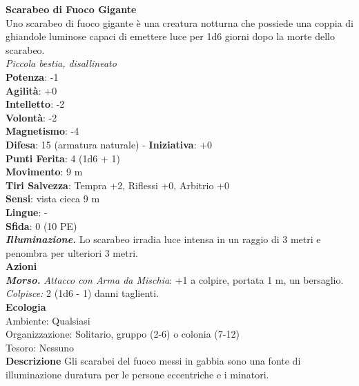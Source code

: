 \begin{multicols}{2}
\medskip\textbf{Scarabeo di Fuoco Gigante}\\
Uno scarabeo di fuoco gigante è una creatura notturna che possiede una coppia di ghiandole luminose capaci di emettere luce per 1d6 giorni dopo la morte dello scarabeo.\\
\emph{Piccola bestia, disallineato}\\
\textbf{Potenza}: -1\\
\textbf{Agilità}: +0\\
\textbf{Intelletto}: -2\\
\textbf{Volontà}: -2\\
\textbf{Magnetismo}: -4\\
\textbf{Difesa}: 15 (armatura naturale) - \textbf{Iniziativa}: +0\\
\textbf{Punti Ferita}: 4 (1d6 + 1)\\
\textbf{Movimento}: 9 m\\
\textbf{Tiri Salvezza}: Tempra +2, Riflessi +0, Arbitrio +0\\
\textbf{Sensi}: vista cieca 9 m\\
\textbf{Lingue}: -\\
\textbf{Sfida}: 0 (10 PE)\smallskip\\
\emph{\textbf{Illuminazione.}} Lo scarabeo irradia luce intensa in un raggio di 3 metri e penombra per ulteriori 3 metri.\\
\smallskip\textbf{Azioni}\\
\emph{\textbf{Morso.} Attacco con Arma da Mischia}: +1 a colpire, portata 1 m, un bersaglio.\\
\emph{Colpisce:} 2 (1d6 - 1) danni taglienti.\\
\textbf{Ecologia}\\
Ambiente: Qualsiasi\\
Organizzazione: Solitario, gruppo (2-6) o colonia (7-12)\\
Tesoro: Nessuno\\
\textbf{Descrizione}
Gli scarabei del fuoco messi in gabbia sono una fonte di illuminazione duratura per le persone eccentriche e i minatori.


\end{multicols}
